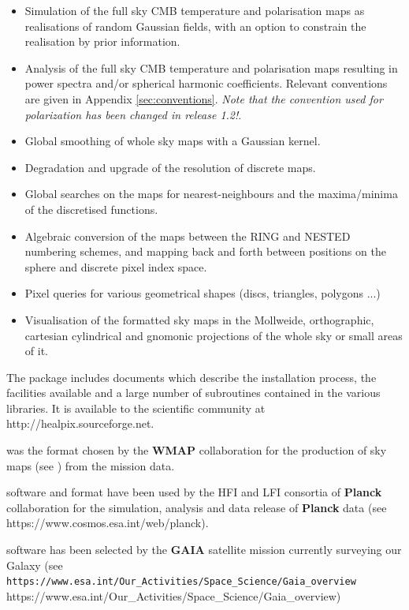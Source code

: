 \documentclass[12pt,twoside]{article}
\newcommand{\healpixwebpage}{http://healpix.sourceforge.net}
\begin{document}
\begin{itemize}
\item Simulation of the full sky CMB temperature and polarisation maps
as realisations of random Gaussian fields, with an option to constrain
the realisation by prior information.
\item Analysis of the full sky CMB temperature and polarisation maps
resulting in power spectra and/or spherical harmonic
coefficients. Relevant conventions are given in Appendix \ref{sec:conventions}.
{\large {\em Note that the convention used for polarization has been changed in
release 1.2!}}.
\item Global smoothing of whole sky maps with a Gaussian kernel.
\item Degradation and upgrade of the resolution of discrete maps.
\item Global searches on the maps for nearest-neighbours and 
the maxima/minima of the discretised functions.
\item Algebraic conversion of the maps between the RING and NESTED numbering
schemes, and mapping back and forth between  positions on the sphere and 
discrete pixel index space.
\item Pixel queries for various geometrical shapes (discs, triangles, polygons ...)
\item Visualisation of the \healpix formatted sky maps in the
Mollweide, orthographic, cartesian cylindrical and gnomonic
projections of the whole sky or small areas of it. 
\end{itemize}

The package includes documents which describe the installation
process, the facilities available and a large number of 
subroutines contained in the various libraries. It is
available to the scientific community  at \htmladdnormallink{\texttt{\healpixwebpage}}
{\healpixwebpage}.

\healpix was the format chosen by the \textbf{WMAP}
collaboration 
for the production
of sky maps (see 
)
 from the mission data. 

\healpix software and format have been used by the HFI and LFI consortia of \textbf{Planck}
collaboration for the simulation, analysis and data release of \textbf{Planck} data
(see %
{https://www.cosmos.esa.int/web/planck}).

\healpix software has been selected by the \textbf{GAIA} satellite mission currently surveying our Galaxy
(see 
\htmladdnormallink%
{\texttt{https://www.esa.int/Our\_\-Activities/Space\_\-Science/Gaia\_\-overview}}%
{https://www.esa.int/Our_Activities/Space_Science/Gaia_overview})
\end{document}
